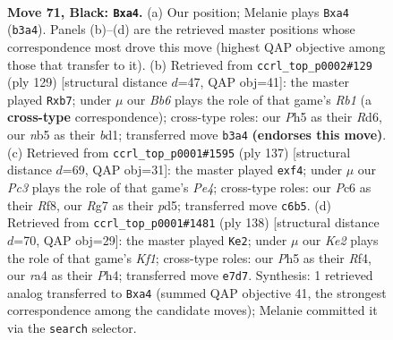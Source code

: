 \documentclass[11pt]{article}
\begin{document}
\clearpage

\begin{figure}[p]\centering
\begin{subfigure}{0.46\textwidth}\centering
\resizebox{\linewidth}{!}{%
\newchessgame
\chessboard[
  setfen={8/p1p1k1r1/P1p3p1/1NP2p1p/RP3P1P/1b4R1/5K2/8 b - - 0 71},
  showmover=false,
  pgfstyle=straightmove, color=movearrow, markmove={b3-a4}
]}
\caption{}
\end{subfigure}\hfill
\begin{subfigure}{0.46\textwidth}\centering
\resizebox{\linewidth}{!}{%
\newchessgame
\chessboard[
  setfen={1r6/1RR2pk1/3r4/1p1p1Pp1/4p2p/4P2P/6P1/3B3K b - - 0 65},
  showmover=false,
  pgfstyle=straightmove, color=movearrow, markmove={b8-b7}
]}
\caption{}
\end{subfigure}
\\[4pt]
\begin{subfigure}{0.46\textwidth}\centering
\resizebox{\linewidth}{!}{%
\newchessgame
\chessboard[
  setfen={2r2r2/6k1/1p1p2p1/p2Pp3/P3PN1P/1P4R1/5R1K/8 b - - 0 69},
  showmover=false,
  pgfstyle=straightmove, color=movearrow, markmove={e5-f4}
]}
\caption{}
\end{subfigure}\hfill
\begin{subfigure}{0.46\textwidth}\centering
\resizebox{\linewidth}{!}{%
\newchessgame
\chessboard[
  setfen={8/4r1k1/3r1p2/2p4p/pp2PRpP/1P1P2P1/P2R4/5K2 w - - 0 70},
  showmover=false,
  pgfstyle=straightmove, color=movearrow, markmove={f1-e2}
]}
\caption{}
\end{subfigure}
\caption{\textbf{Move 71, Black: \texttt{Bxa4}.} (a) Our position; Melanie plays \texttt{Bxa4} (\texttt{b3a4}). Panels (b)--(d) are the retrieved master positions whose correspondence most drove this move (highest QAP objective among those that transfer to it). (b) Retrieved from \texttt{ccrl\_top\_p0002\#129} (ply 129) [structural distance $d$=47, QAP obj=41]: the master played \texttt{Rxb7}; under $\mu$ our \emph{Bb6} plays the role of that game's \emph{Rb1} (a \textbf{cross-type} correspondence); cross-type roles: our \emph{P}h5 as their \emph{R}d6, our \emph{n}b5 as their \emph{b}d1; transferred move \texttt{b3a4} \textbf{(endorses this move)}. (c) Retrieved from \texttt{ccrl\_top\_p0001\#1595} (ply 137) [structural distance $d$=69, QAP obj=31]: the master played \texttt{exf4}; under $\mu$ our \emph{Pc3} plays the role of that game's \emph{Pe4}; cross-type roles: our \emph{P}c6 as their \emph{R}f8, our \emph{R}g7 as their \emph{p}d5; transferred move \texttt{c6b5}. (d) Retrieved from \texttt{ccrl\_top\_p0001\#1481} (ply 138) [structural distance $d$=70, QAP obj=29]: the master played \texttt{Ke2}; under $\mu$ our \emph{Ke2} plays the role of that game's \emph{Kf1}; cross-type roles: our \emph{P}h5 as their \emph{R}f4, our \emph{r}a4 as their \emph{P}h4; transferred move \texttt{e7d7}. Synthesis: 1 retrieved analog transferred to \texttt{Bxa4} (summed QAP objective 41, the strongest correspondence among the candidate moves); Melanie committed it via the \texttt{search} selector.}
\label{fig:thought-m141}
\end{figure}
\end{document}
